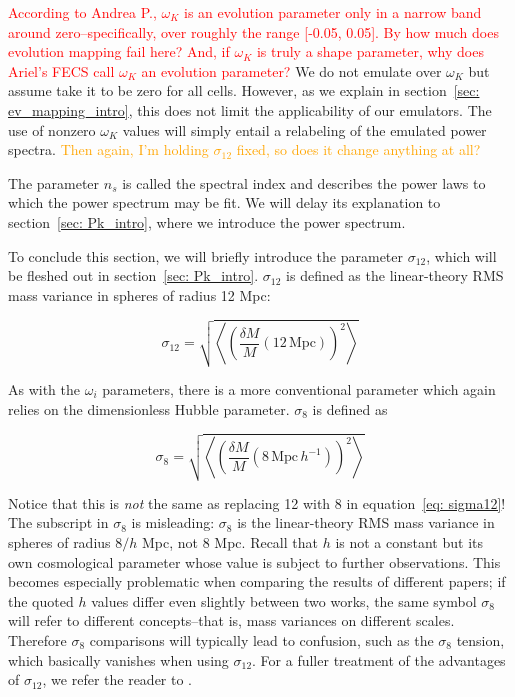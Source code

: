 
\textcolor{red}{According to Andrea P., $\omega_K$ is an evolution parameter 
only in a narrow 
band around zero--specifically, over roughly the range [-0.05, 0.05].
By how much does evolution mapping fail here? And, if 
$\omega_K$ is truly a shape parameter, why does Ariel's FECS call $\omega_K$
an evolution parameter?} We do not emulate over $\omega_K$ but assume take
it to be zero for all cells. However, as we explain in
section~\ref{sec: ev_mapping_intro}, this does not limit the applicability of
our emulators. The use of nonzero $\omega_K$ values will simply entail a
relabeling of the emulated power spectra. \textcolor{orange}{Then again, I'm
holding $\sigma_{12}$ fixed, so does it change anything at all?}


The parameter $n_s$ is called the spectral index and describes the power laws
to which the power spectrum may be fit. We will delay its explanation to
section~\ref{sec: Pk_intro}, where we introduce the power spectrum.


To conclude this section, we will briefly introduce the parameter
$\sigma_{12}$, which will be fleshed out in section~\ref{sec: Pk_intro}. 
$\sigma_{12}$ is defined as the linear-theory RMS mass variance in spheres
of radius 12 Mpc:

\begin{equation}
\label{eq: sigma12}
\sigma_{12}
=
\sqrt{\left\langle \left(
	\frac{\delta M}{M} (12 \, \mathrm{Mpc})
\right)^2 \right\rangle}
\end{equation}

As with the $\omega_i$ parameters, there is a more conventional parameter
which again relies on the dimensionless Hubble parameter. $\sigma_8$ is
defined as

\begin{equation}
\sigma_8
=
\sqrt{\left\langle \left(
	\frac{\delta M}{M} (8 \, \mathrm{Mpc} \, h^{-1})
\right)^2 \right\rangle}
\end{equation}

Notice that this is \textit{not} the same as replacing 12 with 8 in
equation~\ref{eq: sigma12}! The subscript in $\sigma_8$ is misleading:
$\sigma_8$ is the linear-theory RMS mass variance in spheres of radius
$8 / h$ Mpc, not 8 Mpc. Recall that $h$ is not a constant but its own 
cosmological parameter whose value is subject to further observations. This
becomes especially problematic when comparing the results of different papers;
if the quoted $h$ values differ even slightly between two works, the same
symbol $\sigma_8$ will refer to different concepts--that is, mass variances on
different scales. Therefore $\sigma_8$ comparisons will typically lead to
confusion, such as the $\sigma_8$ tension, which basically vanishes when using
$\sigma_{12}$. For a fuller treatment of the advantages of $\sigma_{12}$, we
refer the reader to .

